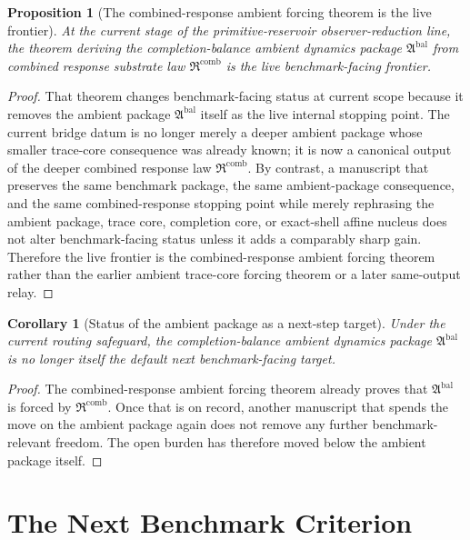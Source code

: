 \documentclass[11pt]{article}
\newcommand{\AmbientPackage}{\mathfrak A^{\mathrm{bal}}}
\newcommand{\CombinedLaw}{\mathfrak R^{\mathrm{comb}}}
\newtheorem{proposition}{Proposition}
\newtheorem{corollary}{Corollary}
\begin{document}
\begin{proposition}[The combined-response ambient forcing theorem is the live frontier]
At the current stage of the primitive-reservoir observer-reduction line, the theorem deriving the completion-balance ambient dynamics package \(\AmbientPackage\) from combined response substrate law \(\CombinedLaw\) is the live benchmark-facing frontier.
\end{proposition}

\begin{proof}
That theorem changes benchmark-facing status at current scope because it removes the ambient package \(\AmbientPackage\) itself as the live internal stopping point. The current bridge datum is no longer merely a deeper ambient package whose smaller trace-core consequence was already known; it is now a canonical output of the deeper combined response law \(\CombinedLaw\). By contrast, a manuscript that preserves the same benchmark package, the same ambient-package consequence, and the same combined-response stopping point while merely rephrasing the ambient package, trace core, completion core, or exact-shell affine nucleus does not alter benchmark-facing status unless it adds a comparably sharp gain. Therefore the live frontier is the combined-response ambient forcing theorem rather than the earlier ambient trace-core forcing theorem or a later same-output relay.
\end{proof}

\begin{corollary}[Status of the ambient package as a next-step target]
Under the current routing safeguard, the completion-balance ambient dynamics package \(\AmbientPackage\) is no longer itself the default next benchmark-facing target.
\end{corollary}

\begin{proof}
The combined-response ambient forcing theorem already proves that \(\AmbientPackage\) is forced by \(\CombinedLaw\). Once that is on record, another manuscript that spends the move on the ambient package again does not remove any further benchmark-relevant freedom. The open burden has therefore moved below the ambient package itself.
\end{proof}

\section{The Next Benchmark Criterion}
\end{document}
